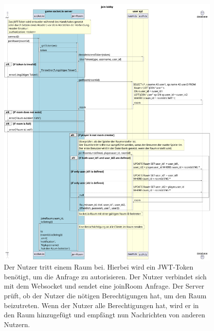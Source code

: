 \documentclass[
]{article}
\begin{document}
\begin{figure}[H]
	\centering
	\includegraphics[width=\textwidth ]{resources/join_lobby.pdf}
	\caption{Der Nutzer tritt einem Raum bei. Hierbei wird ein JWT-Token benötigt, um die Anfrage zu autorisieren. Der Nutzer verbindet sich mit dem Websocket und sendet eine joinRoom Anfrage. Der Server prüft, ob der Nutzer die nötigen Berechtigungen hat, um den Raum beizutreten. Wenn der Nutzer alle Berechtigungen hat, wird er in den Raum hinzugefügt und empfängt nun Nachrichten von anderen Nutzern.}
	\label{fig:ablaufdiagramm-join_lobby}
\end{figure}
\end{document}
